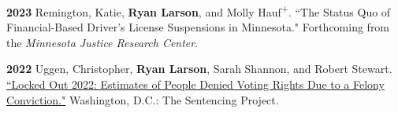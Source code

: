 \documentclass[letterpaper]{article}
\newenvironment{publist}{%
  \begin{list}{}{%
    \setlength{\leftmargin}{0cm}   %
    \setlength{\labelwidth}{2cm}     %
    \setlength{\labelsep}{0.5cm}     %
  }%
}{%
  \end{list}%
}
\renewenvironment{itemize}{
  \begin{list}{}{
    \setlength{\leftmargin}{1.5em}
  }
}{
  \end{list}
}
\begin{document}
\begin{publist}
\begin{itemize}
\end{itemize}

\item[\textbf{2023}] Remington, Katie, \textbf{Ryan Larson}, and Molly Hauf\textsuperscript{+}. ``The Status Quo of Financial-Based Driver's License Suspensions in Minnesota." Forthcoming from the \textit{Minnesota Justice Research Center}.

\item[\textbf{2022}] Uggen, Christopher, \textbf{Ryan Larson}, Sarah Shannon, and Robert Stewart. \href{https://www.sentencingproject.org/app/uploads/2024/02/Locked-Out-2022-Estimates-of-People-Denied-Voting.pdf}{``Locked Out 2022: Estimates of People Denied Voting Rights Due to a Felony Conviction."} Washington, D.C.: The Sentencing Project.

\begin{itemize}

\end{itemize}
\end{publist}
\end{document}
